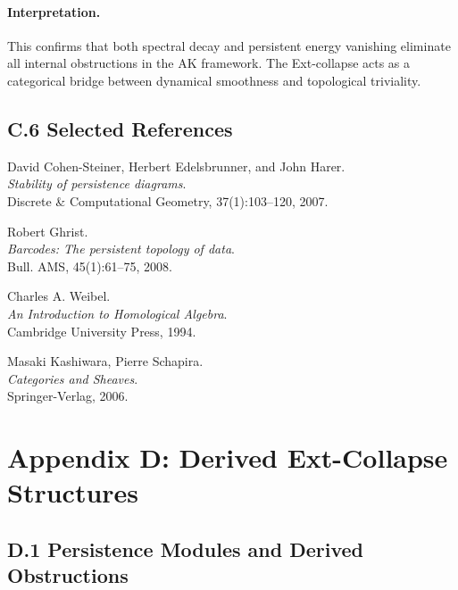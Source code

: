\documentclass[11pt]{article}
\begin{document}
\paragraph{Interpretation.}
This confirms that both spectral decay and persistent energy vanishing eliminate all internal obstructions in the AK framework.  
The Ext-collapse acts as a categorical bridge between dynamical smoothness and topological triviality.


\subsection*{C.6 Selected References}

\begin{thebibliography}{9}

David Cohen-Steiner, Herbert Edelsbrunner, and John Harer.\\
\textit{Stability of persistence diagrams}.\\
Discrete \& Computational Geometry, 37(1):103--120, 2007.

Robert Ghrist.\\
\textit{Barcodes: The persistent topology of data}.\\
Bull. AMS, 45(1):61--75, 2008.

Charles A. Weibel.\\
\textit{An Introduction to Homological Algebra}.\\
Cambridge University Press, 1994.

Masaki Kashiwara, Pierre Schapira.\\
\textit{Categories and Sheaves}.\\
Springer-Verlag, 2006.

\end{thebibliography}




\section*{Appendix D: Derived Ext-Collapse Structures}

\subsection*{D.1 Persistence Modules and Derived Obstructions}
\end{document}
